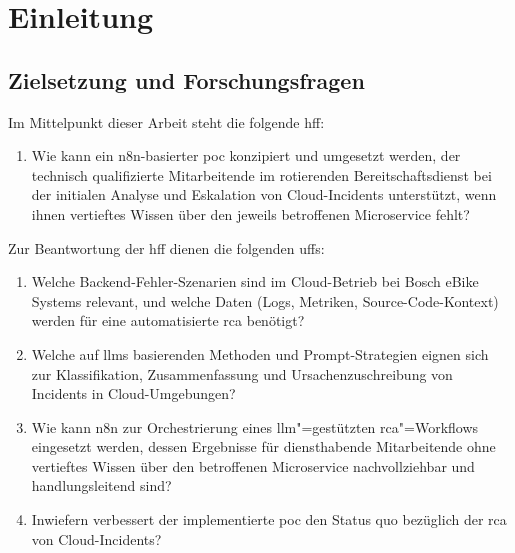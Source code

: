 \chapter{Einleitung}
\label{chap:einleitung}

\section{Zielsetzung und Forschungsfragen}
\label{sec:forschungsfragen}

Im Mittelpunkt dieser Arbeit steht die folgende \gls{hff}:
\begin{enumerate}[label=\textbf{UFF\liningnums{\arabic*}}, ref=UFF\liningnums{\arabic*}, align=left, leftmargin=*, series=forschungsfragen]
  \item[\textbf{HFF}] Wie kann ein n8n-basierter \gls{poc} konzipiert und umgesetzt werden, der technisch qualifizierte Mitarbeitende im rotierenden Bereitschaftsdienst bei der initialen Analyse und Eskalation von Cloud-Incidents unterstützt, wenn ihnen vertieftes Wissen über den jeweils betroffenen Microservice fehlt?
\end{enumerate}
Zur Beantwortung der \gls{hff} dienen die folgenden \glspl{uff}:
\begin{enumerate}[resume*=forschungsfragen]
  \item\label{uff:szenarien} Welche Backend-Fehler-Szenarien sind im Cloud-Betrieb bei Bosch eBike Systems relevant, und welche Daten (Logs, Metriken, Source-Code-Kontext) werden für eine automatisierte \gls{rca} benötigt?
  \item\label{uff:methoden} Welche auf \glspl{llm} basierenden Methoden und Prompt-Strategien eignen sich zur Klassifikation, Zusammenfassung und Ursachenzuschreibung von Incidents in Cloud-Umgebungen?
  \item\label{uff:orchestrierung} Wie kann n8n zur Orchestrierung eines \gls{llm}"=gestützten \gls{rca}"=Workflows eingesetzt werden, dessen Ergebnisse für diensthabende Mitarbeitende ohne vertieftes Wissen über den betroffenen Microservice nachvollziehbar und handlungsleitend sind?
  \item\label{uff:evaluation} Inwiefern verbessert der implementierte \gls{poc} den Status quo bezüglich der \gls{rca} von Cloud-Incidents?
\end{enumerate}

